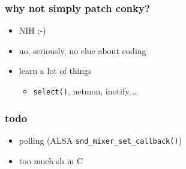 \documentclass{beamer}
\begin{document}
\begin{frame}[fragile]
  \frametitle{why not simply patch conky?}
  \begin{itemize}
    \pause\item NIH ;-)
    \pause\item no, seriously, no clue about coding
    \pause\item learn a lot of things
    \begin{itemize}
      \pause\item \verb+select()+, netmon, inotify,\,\dots
    \end{itemize}
  \end{itemize}
\end{frame}

\begin{frame}[fragile]
  \frametitle{todo}
  \begin{itemize}
    \pause\item polling (ALSA \verb+snd_mixer_set_callback()+)
    \pause\item too much sh in C
  \end{itemize}
\end{frame}
\end{document}
